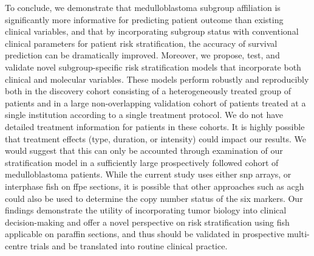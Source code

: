 To conclude, we demonstrate that medulloblastoma subgroup affiliation is significantly more informative for predicting patient outcome than existing clinical variables, and that by incorporating subgroup status with conventional clinical parameters for patient risk stratification, the accuracy of survival prediction can be dramatically improved.  Moreover, we propose, test, and validate novel subgroup-specific risk stratification models that incorporate both clinical and molecular variables.  These models perform robustly and reproducibly both in the discovery cohort consisting of a heterogeneously treated group of patients and in a large non-overlapping validation cohort of patients treated at a single institution according to a single treatment protocol.  We do not have detailed treatment information for patients in these cohorts.  It is highly possible that treatment effects (type, duration, or intensity) could impact our results.  We would suggest that this can only be accounted through examination of our stratification model in a sufficiently large prospectively followed cohort of medulloblastoma patients.  While the current study uses either \gls{snp} arrays, or interphase \gls{fish} on \gls{ffpe} sections, it is possible that other approaches such as \gls{acgh} could also be used to determine the copy number status of the six markers.  Our findings demonstrate the utility of incorporating tumor biology into clinical decision-making and offer a novel perspective on risk stratification using \gls{fish} applicable on paraffin sections, and thus should be validated in prospective multi-centre trials and be translated into routine clinical practice.








\clearpage
